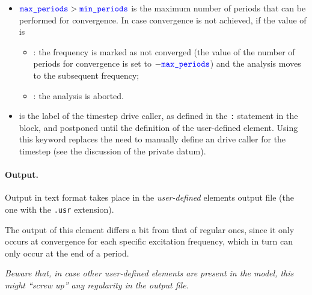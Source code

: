 \begin{itemize}
\item $\textcolor{blue}{\texttt{max\_periods}} > \textcolor{blue}{\texttt{min\_periods}}$ is the maximum number of periods that can be performed for convergence.
In case convergence is not achieved, if the value of  is
\begin{itemize}
\item {}: the frequency is marked as not converged
(the value of the number of periods for convergence is set to $-\textcolor{blue}{\texttt{max\_periods}}$) and the analysis moves to the subsequent frequency;

\item {}: the analysis is aborted.
\end{itemize}

\item {} is the label of the timestep drive caller, as defined in the \texttt{:}  statement in the  block, and postponed until the definition of the user-defined element.
Using this keyword replaces the need to manually define an  drive caller for the timestep
(see the discussion of the  private datum).
\end{itemize}

\paragraph{Output.}
Output in text format takes place in the \emph{user-defined} elements output file (the one with the \texttt{.usr} extension).

The output of this element differs a bit from that of regular ones, since it only occurs at convergence for each specific excitation frequency, which in turn can only occur at the end of a period.

\bigskip

\begin{framed}
\noindent
\emph{Beware that, in case other user-defined elements are present in the model, this might ``screw up'' any regularity in the output file.}
\end{framed}

\bigskip


